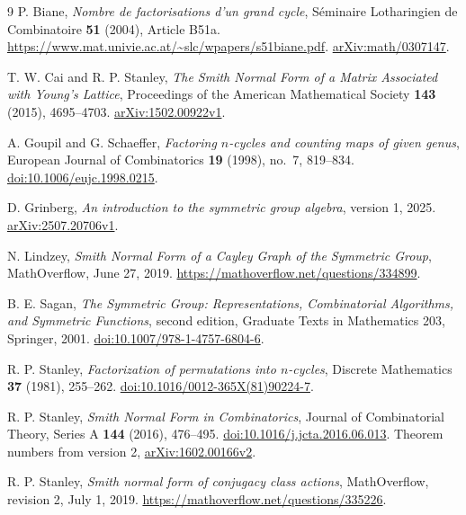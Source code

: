 \documentclass[11pt]{article}
\theoremstyle{remark}
\begin{document}
\begin{thebibliography}{9}
P. Biane, \emph{Nombre de factorisations d'un grand cycle},
S\'eminaire Lotharingien de Combinatoire \textbf{51} (2004), Article B51a.
\url{https://www.mat.univie.ac.at/~slc/wpapers/s51biane.pdf}.
\href{https://arxiv.org/abs/math/0307147}{arXiv:math/0307147}.

T. W. Cai and R. P. Stanley,
\emph{The Smith Normal Form of a Matrix Associated with Young's Lattice},
Proceedings of the American Mathematical Society \textbf{143} (2015), 4695--4703.
\href{https://arxiv.org/abs/1502.00922v1}{arXiv:1502.00922v1}.

A. Goupil and G. Schaeffer,
\emph{Factoring $n$-cycles and counting maps of given genus},
European Journal of Combinatorics \textbf{19} (1998), no.~7, 819--834.
\href{https://doi.org/10.1006/eujc.1998.0215}{doi:10.1006/eujc.1998.0215}.

D. Grinberg, \emph{An introduction to the symmetric group algebra}, version 1, 2025.
\href{https://arxiv.org/abs/2507.20706v1}{arXiv:2507.20706v1}.

N. Lindzey, \emph{Smith Normal Form of a Cayley Graph of the Symmetric Group},
MathOverflow, June 27, 2019.
\url{https://mathoverflow.net/questions/334899}.

B. E. Sagan,
\emph{The Symmetric Group: Representations, Combinatorial Algorithms,
and Symmetric Functions}, second edition,
Graduate Texts in Mathematics 203, Springer, 2001.
\href{https://doi.org/10.1007/978-1-4757-6804-6}{doi:10.1007/978-1-4757-6804-6}.

R. P. Stanley, \emph{Factorization of permutations into $n$-cycles},
Discrete Mathematics \textbf{37} (1981), 255--262.
\href{https://doi.org/10.1016/0012-365X(81)90224-7}{doi:10.1016/0012-365X(81)90224-7}.

R. P. Stanley, \emph{Smith Normal Form in Combinatorics},
Journal of Combinatorial Theory, Series A \textbf{144} (2016), 476--495.
\href{https://doi.org/10.1016/j.jcta.2016.06.013}{doi:10.1016/j.jcta.2016.06.013}.
Theorem numbers from version 2,
\href{https://arxiv.org/abs/1602.00166v2}{arXiv:1602.00166v2}.

R. P. Stanley, \emph{Smith normal form of conjugacy class actions},
MathOverflow, revision 2, July 1, 2019.
\url{https://mathoverflow.net/questions/335226}.
\end{thebibliography}
\end{document}
